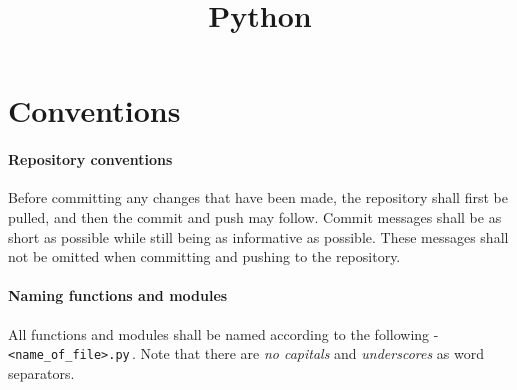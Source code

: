 \documentclass{article}
\title{Python}
\author{}
\date{}
\begin{document}
\maketitle
\section{Conventions}
\paragraph{Repository conventions} Before committing any changes that have been made, the repository shall first be pulled, and then the commit and push may follow. Commit messages shall be as short as possible while still being as informative as possible. These messages shall not be omitted when committing and pushing to the repository.
\paragraph{Naming functions and modules} All functions and modules shall be named according to the following - \verb{<name_of_file>.py{\,. Note that there are \emph{no capitals} and \emph{underscores} as word separators.
\end{document}
